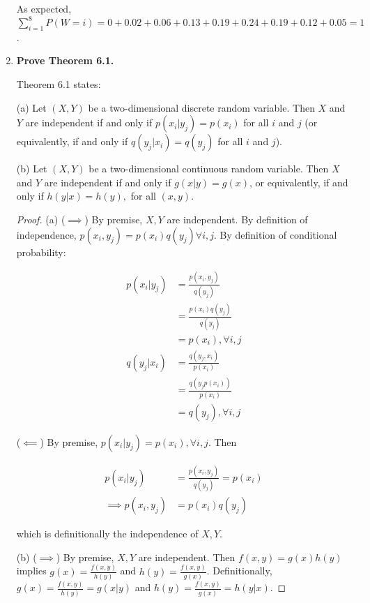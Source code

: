 \documentclass[10pt, oneside]{article}   	%
\theoremstyle{definition}
\begin{document}
\begin{enumerate}[label=6.\arabic*]
As expected, $\sum^8_{i=1} P(W = i) = 0 + 0.02 + 0.06 + 0.13 + 0.19 + 0.24 + 0.19 + 0.12 + 0.05 = \boxed{1}$.

\item  \begin{tcolorbox}[
  colback=Cerulean!5!white,
  colframe=Cerulean!75!black]
\textbf{Prove Theorem 6.1.}
\end{tcolorbox}

Theorem 6.1 states:

(a) Let $(X, Y)$ be a two-dimensional discrete random variable. Then $X$ and $Y$ are independent if and only if $p(x_i | y_j) = p(x_i)$ for all $i$ and $j$ (or equivalently, if and only if $q(y_j | x_i) = q(y_j)$ for all $i$ and $j$).

(b) Let $(X,Y)$ be a two-dimensional continuous random variable. Then $X$ and $Y$ are independent if and only if $g(x | y) = g(x)$, or equivalently, if and only if $h(y | x) = h(y),$ for all $(x,y)$.

\begin{proof}
(a) ($\implies$) By premise, $X, Y$ are independent. By definition of independence, $p(x_i, y_j) = p(x_i) q(y_j) \forall i, j$. By definition of conditional probability:

\begin{align*}
p(x_i | y_j) &= \frac{p(x_i, y_j)}{q(y_j)} \\
&= \frac{p(x_i) q(y_j)}{q(y_j)} \\
&= p(x_i), \forall i, j \\
q(y_j | x_i) &= \frac{q(y_j, x_i)}{p(x_i)} \\
&= \frac{q(y_j p(x_i))}{p(x_i)} \\
&= q(y_j), \forall i, j
\end{align*}

($\impliedby$) By premise, $p(x_i | y_j) = p(x_i), \forall i, j$. Then

\begin{align*}
p(x_i | y_j) &= \frac{p(x_i, y_j)}{q(y_j)} = p(x_i) \\
\implies p(x_i, y_j) &= p(x_i) q(y_j)
\end{align*}

which is definitionally the independence of $X, Y$.

(b) ($\implies$) By premise, $X, Y$ are independent. Then $f(x, y) = g(x) h(y)$ implies $g(x) = \frac{f(x,y)}{h(y)}$ and $h(y) = \frac{f(x,y)}{g(x)}$. Definitionally, $g(x) = \frac{f(x,y)}{h(y)} = g(x | y)$ and $h(y) = \frac{f(x,y)}{g(x)} = h(y | x)$.


\end{proof}
\end{enumerate}
\end{document}
